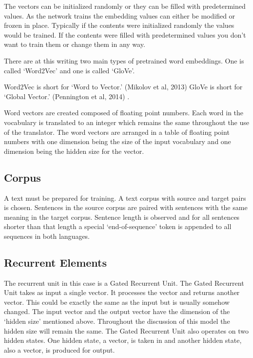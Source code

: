 The vectors can be initialized randomly or they can be filled with predetermined values. As the network trains the embedding values can either be modified or frozen in place. Typically if the contents were initialized randomly the values would be trained. If the contents were filled with predetermined values you don\textquoteright t want to train them or change them in any way. 

There are at this writing two main types of pretrained word embeddings. One is called \textquoteleft Word2Vec\textquoteright{} and one is called \textquoteleft GloVe\textquoteright . 

Word2Vec is short for \textquoteleft Word to Vector.\textquoteright{} (Mikolov et al, 2013)\cite{mikolov2013efficient} GloVe is short for \textquoteleft Global Vector.\textquoteright{} (Pennington et al, 2014)\cite{pennington-etal-2014-glove} .

Word vectors are created composed of floating point numbers. Each word in the vocabulary is translated to an integer which remains the same throughout the use of the translator. The word vectors are arranged in a table of floating point numbers with one dimension being the size of the input vocabulary and one dimension being the hidden size for the vector.


\subsection*{Corpus}

A text must be prepared for training. A text corpus with source and target pairs is chosen. Sentences in the source corpus are paired with sentences with the same meaning in the target corpus. Sentence length is observed and for all sentences shorter than that length a special `end-of-sequence' token is appended to all sequences in both languages.



\subsection*{Recurrent Elements}
The recurrent unit in this case is a Gated Recurrent Unit. The Gated Recurrent Unit takes as input a single vector. It processes the vector and returns another vector. This could be exactly the same as the input but is usually somehow changed. The input vector and the output vector have the dimension of the `hidden size' mentioned above. Throughout the discussion of this model the hidden size will remain the same. The Gated Recurrent Unit also operates on two hidden states. One hidden state, a vector, is taken in and another hidden state, also a vector, is produced for output.

